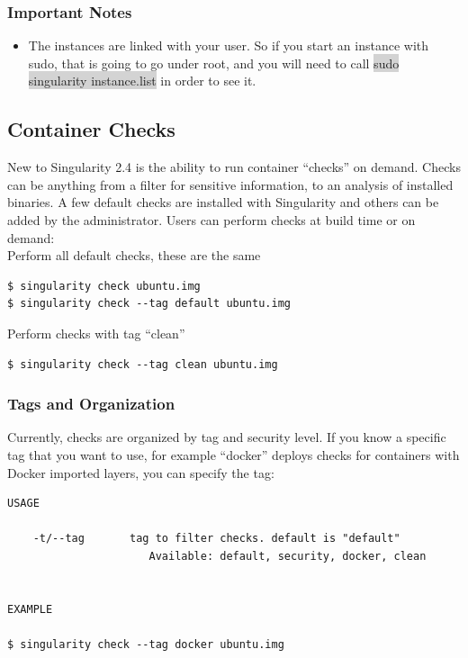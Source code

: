 \documentclass[a4paper]{article}
\begin{document}
\subsubsection{Important Notes}
\begin{itemize}
\item The instances are linked with your user. So if you start an instance with sudo, that is going to go under root, and you will need to call \colorbox{lightgray}{sudo singularity instance.list} in order to see it.
\end{itemize}

\subsection{Container Checks}

New to Singularity 2.4 is the ability to run container “checks” on demand. Checks can be anything from a filter for sensitive information, to an analysis of installed binaries. A few default checks are installed with Singularity and others can be added by the administrator. Users can perform checks at build time or on demand:\\[0.1in]

Perform all default checks, these are the same

\begin{lstlisting}[frame=single]  
$ singularity check ubuntu.img
$ singularity check --tag default ubuntu.img
\end{lstlisting}

Perform checks with tag “clean”

\begin{lstlisting}[frame=single]
$ singularity check --tag clean ubuntu.img  
\end{lstlisting}

\subsubsection{Tags and Organization}

Currently, checks are organized by tag and security level. If you know a specific tag that you want to use, for example “docker” deploys checks for containers with Docker imported layers, you can specify the tag:

\begin{lstlisting}[frame=single]  
USAGE

    -t/--tag       tag to filter checks. default is "default"                      
                      Available: default, security, docker, clean


EXAMPLE

$ singularity check --tag docker ubuntu.img
\end{lstlisting}
\end{document}
